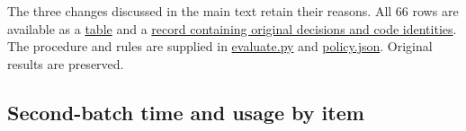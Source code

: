 The three changes discussed in the main text retain their reasons. All 66 rows are available as a \href{verification/revision23/evaluation/assessment.csv}{table} and a \href{verification/revision23/evaluation/assessment.json}{record containing original decisions and code identities}. The procedure and rules are supplied in \href{verification/revision23/evaluation/evaluate.py}{evaluate.py} and \href{verification/revision23/evaluation/policy.json}{policy.json}. Original results are preserved.

\subsection[Second-batch time and usage by item]{\texorpdfstring{\protect\hypertarget{q3}{}Second-batch time and usage by item}{Second-batch time and usage by item}}
\begingroup\small\setlength{\tabcolsep}{3pt}\renewcommand{\arraystretch}{1.14}
